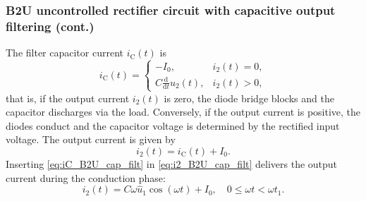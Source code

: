 \begin{frame}
	\frametitle{B2U uncontrolled rectifier circuit with capacitive output filtering (cont.)}
	The filter capacitor current $i_\mathrm{C}(t)$ is
	\begin{equation}
		i_\mathrm{C}(t) = \begin{cases}
			-I_0,                                  & i_2(t) = 0, \\
			C\frac{\mathrm{d}}{\mathrm{d}t}u_2(t), & i_2(t) > 0,
		\end{cases}
		\label{eq:iC_B2U_cap_filt}
	\end{equation}
	that is, if the output current $i_2(t)$ is zero, the diode bridge blocks and the capacitor discharges via the load. Conversely, if the output current is positive, the diodes conduct and the capacitor voltage is determined by the rectified input voltage. \pause The output current is given by
	\begin{equation}
		i_2(t) = i_\mathrm{C}(t) + I_0.
		\label{eq:i2_B2U_cap_filt}
	\end{equation} \pause
	Inserting \eqref{eq:iC_B2U_cap_filt} in \eqref{eq:i2_B2U_cap_filt} delivers the output current during the conduction phase:
	\begin{equation}
		i_2(t) = C\omega \hat{u}_1 \cos(\omega t) + I_0, \quad 0 \leq \omega t < \omega t_1.
		\label{eq:i2_B2U_cap_filt_conduct}
	\end{equation}
\end{frame}

